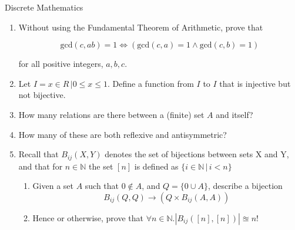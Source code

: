 \documentclass{tripos}  %
\begin{document}
\begin{question}[MockIA,year=2024,paper=1,question=3,author=rrw]{Discrete Mathematics}

  \begin{enumerate}
   
  \item Without using the Fundamental Theorem of Arithmetic, prove that

    \[
    \mbox{gcd}(c,ab) = 1 \Leftrightarrow ( \mbox{gcd}(c,a) = 1 \wedge{} \mbox{gcd}(c,b) = 1)
    \]

    for all positive integers, $a,b,c$.

  \item Let $I = { x \in R\, | 0 \le x \le 1 }$. Define a function from $I$ to $I$ that is injective but not bijective. 
  \item How many relations are there between a (finite) set $A$ and itself? 
  \item How many of these are both reflexive and antisymmetric? 


  \item Recall that $B_{ij}(X,Y)$ denotes the set of bijections between sets X and Y, and that for $n \in \mathbb{N}$ the set $[n]$ is defined as $\{i \in \mathbb{N}\, |\, i < n\}$
    \begin{enumerate}
    \item Given a set $A$ such that $0 \notin A$, and $Q=\{ 0 \cup A \}$, describe a bijection
      \[
      B_{ij}(Q,Q) \rightarrow ( Q \times B_{ij}(A,A) )
      \]
    \item Hence or otherwise, prove that $\forall n \in \mathbb{N}.| B_{ij}([n], [n]) | \approxeq n!$ 
      \end{enumerate}
  \end{enumerate}
  
\end{question}
\end{document}
